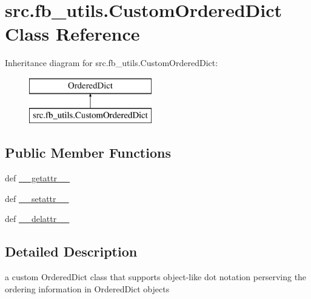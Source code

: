 \hypertarget{classsrc_1_1fb__utils_1_1CustomOrderedDict}{\section{src.\-fb\-\_\-utils.\-Custom\-Ordered\-Dict Class Reference}
\label{classsrc_1_1fb__utils_1_1CustomOrderedDict}
}
Inheritance diagram for src.\-fb\-\_\-utils.\-Custom\-Ordered\-Dict\-:\begin{figure}[H]
\begin{center}
\leavevmode
\includegraphics[height=2.000000cm]{classsrc_1_1fb__utils_1_1CustomOrderedDict}
\end{center}
\end{figure}
\subsection*{Public Member Functions}
\begin{DoxyCompactItemize}
\item 
def \hyperlink{classsrc_1_1fb__utils_1_1CustomOrderedDict_a90bf7568abbbac635c05e873d19ffe1c}{\-\_\-\-\_\-getattr\-\_\-\-\_\-}
\item 
def \hyperlink{classsrc_1_1fb__utils_1_1CustomOrderedDict_ac3246f459fdeadfbafe71d12a57f3046}{\-\_\-\-\_\-setattr\-\_\-\-\_\-}
\item 
def \hyperlink{classsrc_1_1fb__utils_1_1CustomOrderedDict_af9ab225f6b826341ea3df338127da156}{\-\_\-\-\_\-delattr\-\_\-\-\_\-}
\end{DoxyCompactItemize}


\subsection{Detailed Description}
\begin{DoxyVerb}    a custom OrderedDict class that supports object-like dot notation
    perserving the ordering information in OrderedDict objects
\end{DoxyVerb}
 

